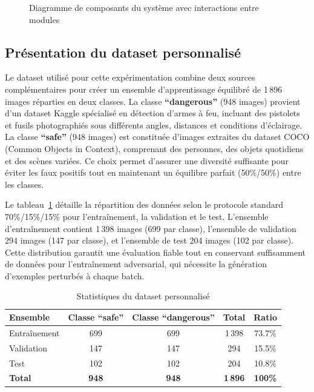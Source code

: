 \begin{figure}[H]
    \centering
    \caption{Diagramme de composants du système avec interactions entre modules}
    \label{fig:diagramme_composants}
\end{figure}


\subsection{Présentation du dataset personnalisé}

Le dataset utilisé pour cette expérimentation combine deux sources complémentaires pour créer un ensemble d'apprentissage équilibré de 1\,896 images réparties en deux classes. La classe \textbf{``dangerous''} (948 images) provient d'un dataset Kaggle spécialisé en détection d'armes à feu, incluant des pistolets et fusils photographiés sous différents angles, distances et conditions d'éclairage. La classe \textbf{``safe''} (948 images) est constituée d'images extraites du dataset COCO (Common Objects in Context), comprenant des personnes, des objets quotidiens et des scènes variées. Ce choix permet d'assurer une diversité suffisante pour éviter les faux positifs tout en maintenant un équilibre parfait (50\%/50\%) entre les classes.

Le tableau~\ref{tab:dataset_stats} détaille la répartition des données selon le protocole standard 70\%/15\%/15\% pour l'entraînement, la validation et le test. L'ensemble d'entraînement contient 1\,398 images (699 par classe), l'ensemble de validation 294 images (147 par classe), et l'ensemble de test 204 images (102 par classe). Cette distribution garantit une évaluation fiable tout en conservant suffisamment de données pour l'entraînement adversarial, qui nécessite la génération d'exemples perturbés à chaque batch.

\begin{table}[H]
    \centering
    \caption{Statistiques du dataset personnalisé}
    \label{tab:dataset_stats}
    \begin{tabular}{lcccc}
        \toprule
        \textbf{Ensemble} & \textbf{Classe ``safe''} & \textbf{Classe ``dangerous''} & \textbf{Total} & \textbf{Ratio} \\
        \midrule
        Entraînement & 699 & 699 & 1\,398 & 73.7\% \\
        Validation   & 147 & 147 & 294   & 15.5\% \\
        Test         & 102 & 102 & 204   & 10.8\% \\
        \midrule
        \textbf{Total} & \textbf{948} & \textbf{948} & \textbf{1\,896} & \textbf{100\%} \\
        \bottomrule
    \end{tabular}
\end{table}

